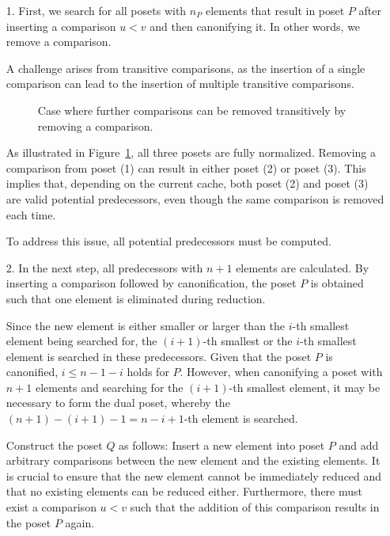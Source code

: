 \documentclass[10pt,journal,compsoc]{IEEEtran}
\begin{document}
\begin{itemize}
  \item[1.]
    First, we search for all posets with $n_P$ elements that result in poset $P$ after inserting a comparison $u < v$ and then canonifying it.
    In other words, we remove a comparison.

    A challenge arises from transitive comparisons, as the insertion of a single comparison can lead to the insertion of multiple transitive comparisons.

    \begin{figure}[!b]
      \centering
      
      \caption{Case where further comparisons can be removed transitively by removing a comparison.}
      \label{fig:backward_problematic}
    \end{figure}

    As illustrated in Figure~\ref{fig:backward_problematic}, all three posets are fully normalized.
    Removing a comparison from poset (1) can result in either poset (2) or poset (3).
    This implies that, depending on the current cache, both poset (2) and poset (3) are valid potential predecessors, even though the same comparison is removed each time.

    To address this issue, all potential predecessors must be computed.

  \item[2.]
    In the next step, all predecessors with $n + 1$ elements are calculated.
    By inserting a comparison followed by canonification, the poset $P$ is obtained such that one element is eliminated during reduction.

    Since the new element is either smaller or larger than the $i$-th smallest element being searched for, the $(i + 1)$-th smallest or the $i$-th smallest element is searched in these predecessors.
    Given that the poset $P$ is canonified, $i \leq n - 1 - i$ holds for $P$.
    However, when canonifying a poset with $n + 1$ elements and searching for the $(i + 1)$-th smallest element, it may be necessary to form the dual poset, whereby the $(n + 1) - (i + 1) - 1 = n - i + 1$-th element is searched.

    Construct the poset $Q$ as follows:
    Insert a new element into poset $P$ and add arbitrary comparisons between the new element and the existing elements.
    It is crucial to ensure that the new element cannot be immediately reduced and that no existing elements can be reduced either.
    Furthermore, there must exist a comparison $u < v$ such that the addition of this comparison results in the poset $P$ again.


\end{itemize}
\end{document}
